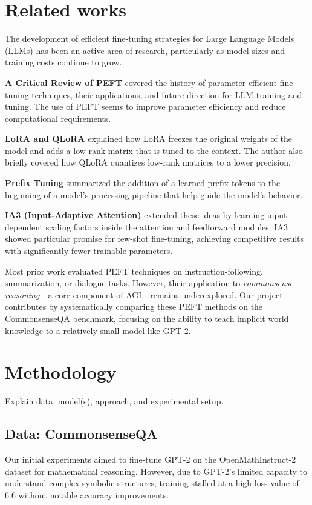 \documentclass[11pt,twocolumn]{article}
\begin{document}
\section{Related works}
\label{sec:background}

The development of efficient fine-tuning strategies for Large Language Models (LLMs) has been an active area of research, particularly as model sizes and training costs continue to grow.

\textbf{A Critical Review of PEFT} \cite{Xu2023} covered the history of parameter-efficient fine-tuning techniques, their applications, and future direction for LLM training and tuning. The use of PEFT seems to improve parameter efficiency and reduce computational requirements.

\textbf{LoRA and QLoRA} \cite{Noble2023} explained how LoRA freezes the original weights of the model and adds a low-rank matrix that is tuned to the context. The author also briefly covered how QLoRA quantizes low-rank matrices to a lower precision.  

\textbf{Prefix Tuning} \cite{Razavi2023} summarized the addition of a learned prefix tokens to the beginning of a model's processing pipeline that help guide the model's behavior.

\textbf{IA3 (Input-Adaptive Attention)} \cite{Liu2022} extended these ideas by learning input-dependent scaling factors inside the attention and feedforward modules. IA3 showed particular promise for few-shot fine-tuning, achieving competitive results with significantly fewer trainable parameters.

Most prior work evaluated PEFT techniques on instruction-following, summarization, or dialogue tasks. However, their application to \textit{commonsense reasoning}—a core component of AGI—remains underexplored. Our project contributes by systematically comparing these PEFT methods on the CommonsenseQA benchmark, focusing on the ability to teach implicit world knowledge to a relatively small model like GPT-2.



\section{Methodology}
\label{sec:methodology}
Explain data, model(s), approach, and experimental setup.

\subsection{Data: CommonsenseQA}
Our initial experiments aimed to fine-tune GPT-2 on the OpenMathInstruct-2 dataset for mathematical reasoning. However, due to GPT-2's limited capacity to understand complex symbolic structures, training stalled at a high loss value of 6.6 without notable accuracy improvements.
\end{document}
